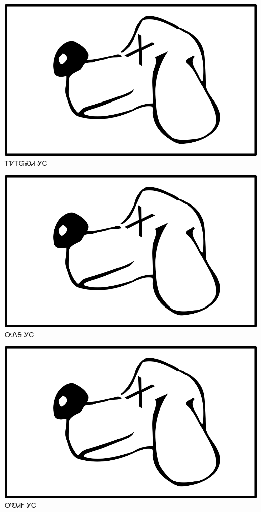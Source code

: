 \documentclass[avery5371]{flashcards}%
\begin{document}
\begin{flashcard}{
\includegraphics[width=0.95\columnwidth,height=.51\columnwidth,keepaspectratio]{../artwork/for-colors/gihli-dead}
}
\Huge ᎢᏤᎢᏳᏍᏗ ᎩᏟ
\end{flashcard}

\begin{flashcard}{
\includegraphics[width=0.95\columnwidth,height=.51\columnwidth,keepaspectratio]{../artwork/for-colors/gihli-dead}
}
\Huge ᎤᏁᎦ ᎩᏟ
\end{flashcard}

\begin{flashcard}{
\includegraphics[width=0.95\columnwidth,height=.51\columnwidth,keepaspectratio]{../artwork/for-colors/gihli-dead}
}
\Huge ᎤᏬᏗᎨ ᎩᏟ
\end{flashcard}
\end{document}
